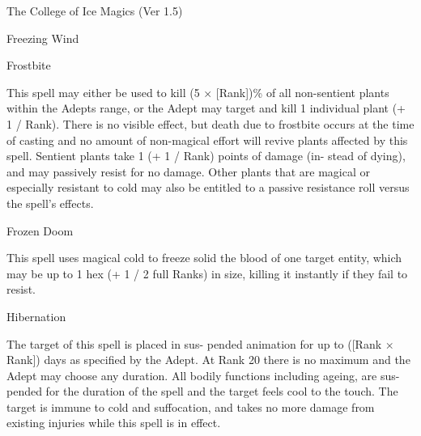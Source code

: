 \begin{Chapter}{The College of Ice Magics (Ver 1.5)}
\begin{spell}[S-3]{Freezing Wind }
\begin{effects}
\end{effects}
\end{spell}

\begin{spell}[S-4]{Frostbite }

\begin{effects}
 This  spell  may  either  be  used  to  kill  (5  × 
[Rank])\%  of  all  non-sentient  plants  within  the 
Adepts  range,  or  the  Adept  may  target  and  kill  1 
individual  plant  (+  1  /  Rank).  There  is  no  visible 
effect, but death due to frostbite occurs at the time 
of  casting  and  no  amount  of  non-magical  effort 
will  revive  plants  affected  by  this  spell.  Sentient 
plants  take  1  (+  1  /  Rank)  points  of  damage  (in-
stead  of  dying),  and  may  passively  resist  for  no 
damage. Other plants that are magical or especially 
resistant  to  cold  may  also  be  entitled  to  a  passive 
resistance roll versus the spell’s effects. 

\end{effects}
\end{spell}

\begin{spell}[S-5]{Frozen Doom }

\begin{effects}
This spell uses magical cold to freeze solid 
the blood of one target entity, which may be up to 
1 hex (+ 1 / 2 full Ranks) in size, killing it instantly 
if they fail to resist. 

\end{effects}
\end{spell}

\begin{spell}[S-6]{Hibernation }

\begin{effects}
 The  target  of  this  spell  is  placed  in  sus-
pended  animation  for  up  to  ([Rank  ×  Rank])  days 
as  specified  by  the  Adept.  At  Rank  20  there  is  no 
maximum and the Adept may choose any duration. 
All  bodily  functions  including  ageing,  are  sus-
pended  for  the  duration  of  the  spell  and  the  target 
feels  cool  to  the  touch.  The  target  is  immune  to 
cold  and  suffocation,  and  takes  no  more  damage 
from  existing  injuries  while  this  spell  is  in  effect. 


\end{effects}
\end{spell}
\end{Chapter}

